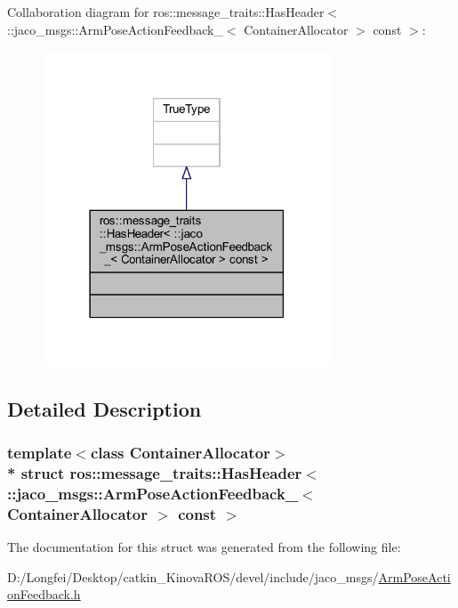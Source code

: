 Collaboration diagram for ros\+:\+:message\+\_\+traits\+:\+:Has\+Header$<$ \+:\+:jaco\+\_\+msgs\+:\+:Arm\+Pose\+Action\+Feedback\+\_\+$<$ Container\+Allocator $>$ const $>$\+:
\nopagebreak
\begin{figure}[H]
\begin{center}
\leavevmode
\includegraphics[width=243pt]{df/dc9/structros_1_1message__traits_1_1HasHeader_3_01_1_1jaco__msgs_1_1ArmPoseActionFeedback___3_01Cont64b7c0e24891c39378f1a72dd1e136c7}
\end{center}
\end{figure}


\subsection{Detailed Description}
\subsubsection*{template$<$class Container\+Allocator$>$\\*
struct ros\+::message\+\_\+traits\+::\+Has\+Header$<$ \+::jaco\+\_\+msgs\+::\+Arm\+Pose\+Action\+Feedback\+\_\+$<$ Container\+Allocator $>$ const  $>$}



The documentation for this struct was generated from the following file\+:\begin{DoxyCompactItemize}
\item 
D\+:/\+Longfei/\+Desktop/catkin\+\_\+\+Kinova\+R\+O\+S/devel/include/jaco\+\_\+msgs/\hyperlink{ArmPoseActionFeedback_8h}{Arm\+Pose\+Action\+Feedback.\+h}\end{DoxyCompactItemize}

